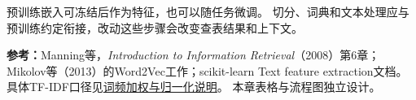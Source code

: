 预训练嵌入可冻结后作为特征，也可以随任务微调。
切分、词典和文本处理应与预训练约定衔接，改动这些步骤会改变查表结果和上下文。

\begingroup\small
\noindent\textbf{参考：}Manning等，\textit{Introduction to Information Retrieval}（2008）第6章；
Mikolov等（2013）的Word2Vec工作；scikit-learn Text feature extraction文档。
具体TF-IDF口径见\href{https://scikit-learn.org/stable/modules/feature_extraction.html#tfidf-term-weighting}{词频加权与归一化说明}。
本章表格与流程图独立设计。
\par\endgroup
